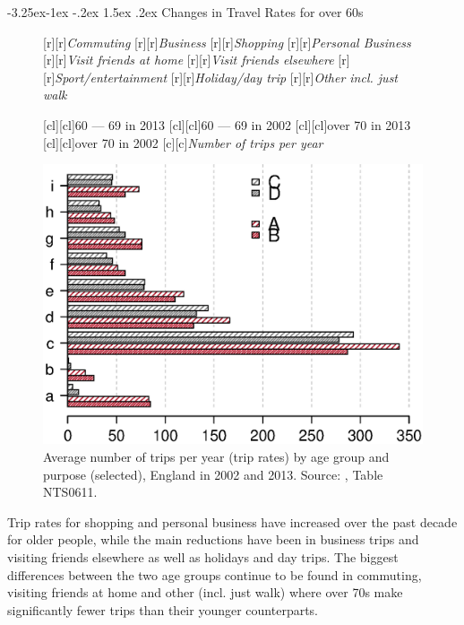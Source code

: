 \documentclass[11 pt, a4paper]{report}
\makeatletter
\renewcommand\subsection{\@startsection{subsection}{2}{\z@}%
                                     {-3.25ex\@plus -1ex \@minus -.2ex}%
                                     {1.5ex \@plus .2ex}%
    								{\large\scshape}}
\makeatother
\begin{document}
\subsection{Changes in Travel Rates for over 60s}
\begin{figure}[hbtp!]
[r][r]{\small{\emph{Commuting}}}
[r][r]{\small{\emph{Business}}}
[r][r]{\small{\emph{Shopping}}}
[r][r]{\small{\emph{Personal Business}}}
[r][r]{\small{\emph{Visit friends at home}}}
[r][r]{\small{\emph{Visit friends elsewhere}}}
[r][r]{\small{\emph{Sport/entertainment}}}
[r][r]{\small{\emph{Holiday/day trip}}}
[r][r]{\small{\emph{Other incl. just walk}}}


[cl][cl]{\small{60 --- 69 in 2013}}
[cl][cl]{\small{60 --- 69 in 2002}}
[cl][cl]{\small{over 70 in 2013}}
[cl][cl]{\small{over 70 in 2002}}
[c][c]{\small{\emph{Number of trips per year}}}

\includegraphics[width=\textwidth]{../figures/Fig9.2.eps}
\caption{Average number of trips per year (trip rates) by age group and purpose (selected),  England in 2002 and 2013. Source: \citet{DoT201}, Table NTS0611.}\label{Fig:91} %
\end{figure}

Trip rates for shopping and personal business have increased over the past decade for older people, while the main reductions have been in business trips and visiting friends elsewhere as well as holidays and day trips. The biggest differences between the two age groups continue to be found in commuting, visiting friends at home and other (incl. just walk) where over 70s make significantly fewer trips than their younger counterparts. 
\end{document}
